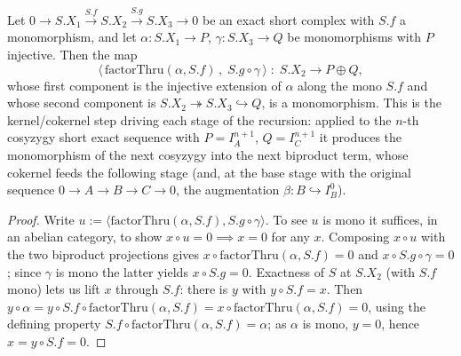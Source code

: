 \begin{lemma}\label{mk-lem:horseshoe_stage_mono}
  \leanok

  Let \(0 \to S.X_1 \xrightarrow{S.f} S.X_2 \xrightarrow{S.g} S.X_3 \to 0\) be an exact
  short complex with \(S.f\) a monomorphism, and let \(\alpha : S.X_1 \to P\),
  \(\gamma : S.X_3 \to Q\) be monomorphisms with \(P\) injective. Then the map
  \[
    \bigl\langle\, \mathrm{factorThru}(\alpha, S.f)\,,\; S.g \circ \gamma \,\bigr\rangle
      \;:\; S.X_2 \longrightarrow P \oplus Q,
  \]
  whose first component is the injective extension of \(\alpha\) along the mono \(S.f\)
  and whose second component is \(S.X_2 \twoheadrightarrow S.X_3 \hookrightarrow Q\), is a
  monomorphism. This is the kernel/cokernel step driving each stage of the recursion:
  applied to the \(n\)-th cosyzygy short exact sequence with \(P = I_A^{n+1}\),
  \(Q = I_C^{n+1}\) it produces the monomorphism of the next cosyzygy into the next
  biproduct term, whose cokernel feeds the following stage (and, at the base stage with
  the original sequence \(0 \to A \to B \to C \to 0\), the augmentation
  \(\beta : B \hookrightarrow I_B^0\)).
\end{lemma}

\begin{proof}
  \leanok
  Write \(u := \langle \mathrm{factorThru}(\alpha, S.f), S.g \circ \gamma\rangle\). To see
  \(u\) is mono it suffices, in an abelian category, to show \(x \circ u = 0 \implies x = 0\)
  for any \(x\). Composing \(x \circ u\) with the two biproduct projections gives
  \(x \circ \mathrm{factorThru}(\alpha, S.f) = 0\) and \(x \circ S.g \circ \gamma = 0\);
  since \(\gamma\) is mono the latter yields \(x \circ S.g = 0\). Exactness of \(S\) at
  \(S.X_2\) (with \(S.f\) mono) lets us lift \(x\) through \(S.f\): there is \(y\) with
  \(y \circ S.f = x\). Then \(y \circ \alpha = y \circ S.f \circ \mathrm{factorThru}(\alpha, S.f)
  = x \circ \mathrm{factorThru}(\alpha, S.f) = 0\), using the defining property
  \(S.f \circ \mathrm{factorThru}(\alpha, S.f) = \alpha\); as \(\alpha\) is mono, \(y = 0\),
  hence \(x = y \circ S.f = 0\).
\end{proof}

